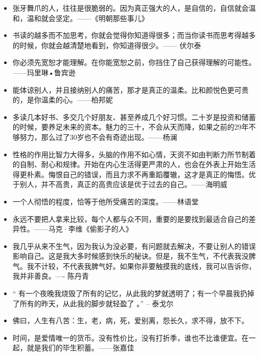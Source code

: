 \documentclass[UTF8,a4paper,8pt]{ctexart}
\begin{document}
\begin{itemize}
 	\item 张牙舞爪的人，往往是很脆弱的。因为真正强大的人，是自信的，自信就会温和，温和就会坚定。——《明朝那些事儿》
 	
 	\item 书读的越多而不加思考，你就会觉得你知道得很多；而当你读书而思考得越多的时候，你就会越清楚地看到，你知道得很少。—— 伏尔泰
 	
 	\item 你必须先宽恕才能理解。在你能宽恕之前，你挡住了自己获得理解的可能性。——玛里琳•鲁宾逊
 	
 	\item 能体谅别人，并且接纳别人的痛苦，那才是真正的温柔。比和颜悦色更可贵的，是你温柔的心。——柏邦妮
 	
 	\item 多读几本好书、多交几个好朋友、甚至养成几个好习惯。二十岁是投资和储蓄的时候，要养足未来的资本。魅力的三十，不会从天而降，如果之前的29年不够努力，那么过了30岁也不会有奇迹出现。——杨澜
 	
 	\item 性格的作用比智力大得多，头脑的作用不如心情，天资不如由判断力所节制着的自制、耐心和规律。开始在内心生活得更严肃的人，也会在外表上开始生活得更朴素。悔恨自己的错误，而且力求不再重蹈覆辙，这才是真正的悔悟。优于别人，并不高贵，真正的高贵应该是优于过去的自己。——海明威
 	
 	\item 一个人彻悟的程度，恰等于他所受痛苦的深度。——林语堂
 	
 	\item 永远不要把人拿来比较，每个人都与众不同，重要的是要找到最适合自己的差异性。——马克·李维《偷影子的人》
 	
 	\item 我几乎从来不生气，因为我认为没必要，有问题就去解决，不要让别人的错误影响自己。这是我大多时候感到快乐的秘诀。但是，我不生气，不代表我没脾气。我不计较，不代表我脾气好。如果你非要触摸我的底线，我可以告诉你，我并非善良。---- 陈丹青
 	
 	\item “ 有一个夜晚我烧毁了所有的记忆，从此我的梦就透明了；有一个早晨我扔掉了所有的昨天，从此我的脚步就轻盈了 。” -- 泰戈尔
 	
 	\item 佛曰，人生有八苦：生，老，病，死，爱别离，怨长久，求不得，放不下。
 	
 	\item 时间，是爱情唯一的货币。没有性价比，没有打折季，谁也不比谁便宜。在一起，就是我们的毕生积蓄。——张嘉佳
 	

\end{itemize}
\end{document}
